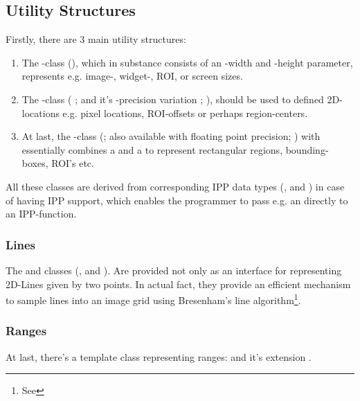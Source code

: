 \subsection{Utility Structures}
Firstly, there are 3 main utility structures:
\begin{enumerate}
\item The -class (), which in substance consists of an -width and -height parameter, represents e.g. image-, widget-, ROI,  or screen sizes.
\item The -class ( ; and it's -precision variation ; ), should be used to defined 2D-locations e.g. pixel locations, ROI-offsets or perhaps region-centers.
\item At last, the -class (; also available with floating point precision; ) with essentially combines a  and a  to represent rectangular regions, bounding-boxes, ROI's etc.
\end{enumerate}
All these classes are derived from corresponding IPP data types (,  and ) in case of having IPP support, which enables the programmer to pass e.g. an  directly to an IPP-function.

\subsubsection{Lines}
The  and  classes (, and ). Are provided not only as an interface for representing 2D-Lines given by two points. In actual fact, they provide an efficient mechanism to sample lines into an image grid using Bresenham's line algorithm\footnote{See }.

\subsubsection{Ranges}
At last, there's a template class representing ranges:  and it's extension .

